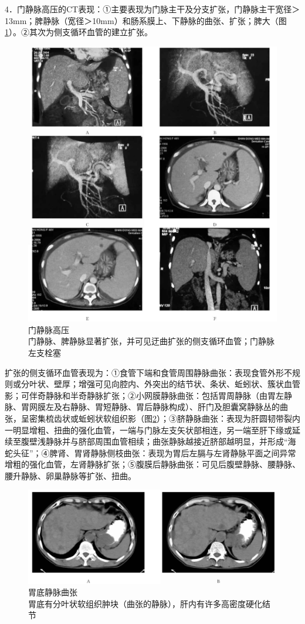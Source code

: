 4．门静脉高压的CT表现：①主要表现为门脉主干及分支扩张，门静脉主干宽径＞13mm；脾静脉（宽径＞10mm）和肠系膜上、下静脉的曲张、扩张；脾大（图\ref{fig11-14}）。②其次为侧支循环血管的建立扩张。

\begin{figure}[!htbp]
 \centering
 \includegraphics[width=.7\textwidth,height=\textheight,keepaspectratio]{./images/Image00286.jpg}
 \captionsetup{justification=centering}
 \caption{门静脉高压\\{\small 门静脉、脾静脉显著扩张，并可见迂曲扩张的侧支循环血管；门静脉左支栓塞}}
 \label{fig11-14}
  \end{figure} 

扩张的侧支循环血管表现为：①食管下端和食管周围静脉曲张：表现食管外形不规则或分叶状、壁厚；增强可见向腔内、外突出的结节状、条状、蚯蚓状、簇状血管影；可伴奇静脉和半奇静脉扩张；②小网膜静脉曲张：包括胃周静脉（由胃左静脉、胃网膜左及右静脉、胃短静脉、胃后静脉构成）、肝门及胆囊窝静脉丛的曲张，呈密集梳齿状或蚯蚓状软组织影（图\ref{fig11-15}）；③脐静脉曲张：表现为肝圆韧带裂内一明显增粗、扭曲的强化血管，一端与门脉左支矢状部相连，另一端至肝下缘或延续至腹壁浅静脉并与脐部周围血管相续；曲张静脉越接近脐部越明显，并形成“海蛇头征”；④脾肾、胃肾静脉侧枝曲张：表现为胃后左膈与左肾静脉平面之间异常增粗的强化血管，左肾静脉扩张；⑤腹膜后静脉曲张：可见后腹壁静脉、腰静脉、腰升静脉、卵巢静脉等扩张、扭曲。

\begin{figure}[!htbp]
 \centering
 \includegraphics[width=.7\textwidth,height=\textheight,keepaspectratio]{./images/Image00287.jpg}
 \captionsetup{justification=centering}
 \caption{胃底静脉曲张\\{\small 胃底有分叶状软组织肿块（曲张的静脉），肝内有许多高密度硬化结节}}
 \label{fig11-15}
  \end{figure} 

